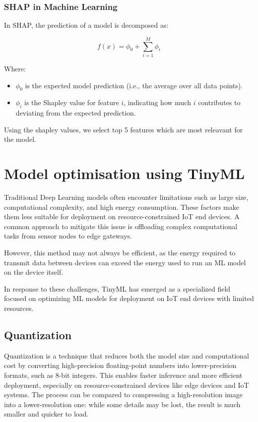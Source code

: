 \documentclass[conference,letterpaper]{IEEEtran}
\begin{document}
\subsubsection*{SHAP in Machine Learning}

In SHAP, the prediction of a model is decomposed as:

\[
f(x) = \phi_0 + \sum_{i=1}^{M} \phi_i
\]

Where:
\begin{itemize}
    \item \( \phi_0 \) is the expected model prediction (i.e., the average over all data points).
    \item \( \phi_i \) is the Shapley value for feature \( i \), indicating how much \( i \) contributes to deviating from the expected prediction.
\end{itemize}
Using the shapley values, we select top 5 features which are most releavant for the model.

\section{Model optimisation using TinyML}
Traditional Deep Learning models often encounter limitations such as large size, computational complexity, and high energy consumption. These factors make them less suitable for deployment on resource-constrained IoT end devices. A common approach to mitigate this issue is offloading complex computational tasks from sensor nodes to edge gateways.

 However, this method may not always be efficient, as the energy required to transmit data between devices can exceed the energy used to run an ML model on the device itself.

In response to these challenges, TinyML has emerged as a specialized field focused on optimizing ML models for deployment on IoT end devices with limited resources.

\subsection{Quantization}

Quantization is a technique that reduces both the model size and computational cost by converting high-precision floating-point numbers into lower-precision formats, such as 8-bit integers. This enables faster inference and more efficient deployment, especially on resource-constrained devices like edge devices and IoT systems. The process can be compared to compressing a high-resolution image into a lower-resolution one: while some details may be lost, the result is much smaller and quicker to load.
\end{document}
